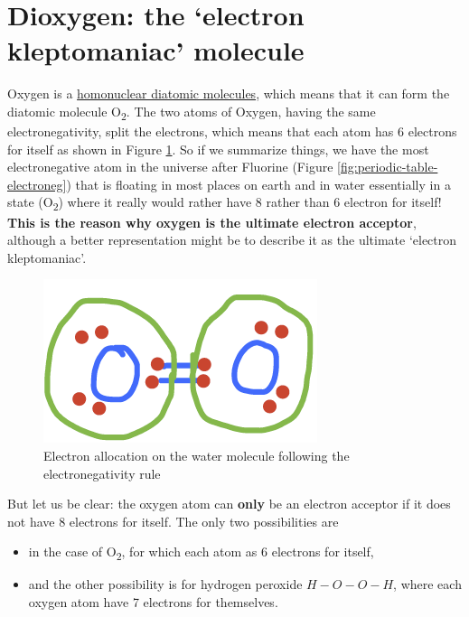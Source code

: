 \documentclass[]{book}
\providecommand{\tightlist}{%
  \setlength{\itemsep}{0pt}\setlength{\parskip}{0pt}}
\theoremstyle{definition}
\theoremstyle{definition}
\theoremstyle{definition}
\theoremstyle{remark}
\begin{document}
\section{\texorpdfstring{Dioxygen: the `electron kleptomaniac'
molecule}{Dioxygen: the electron kleptomaniac molecule}}\label{dioxygen-the-electron-kleptomaniac-molecule}

Oxygen is a
\href{https://en.wikipedia.org/wiki/Diatomic_molecule}{homonuclear
diatomic molecules}, which means that it can form the diatomic molecule
O\textsubscript{2}. The two atoms of Oxygen, having the same
electronegativity, split the electrons, which means that each atom has 6
electrons for itself as shown in Figure \ref{fig:elecalloc-O2}. So if we
summarize things, we have the most electronegative atom in the universe
after Fluorine (Figure \ref{fig:periodic-table-electroneg}) that is
floating in most places on earth and in water essentially in a state
(O\textsubscript{2}) where it really would rather have 8 rather than 6
electron for itself! \textbf{This is the reason why oxygen is the
ultimate electron acceptor}, although a better representation might be
to describe it as the ultimate `electron kleptomaniac'.

\begin{figure}

{\centering \includegraphics[width=0.25\linewidth]{pictures/ElecAlloc_O2} 

}

\caption{Electron allocation on the water molecule following the electronegativity rule}\label{fig:elecalloc-O2}
\end{figure}

But let us be clear: the oxygen atom can \textbf{only} be an electron
acceptor if it does not have 8 electrons for itself. The only two
possibilities are

\begin{itemize}
\tightlist
\item
  in the case of O\textsubscript{2}, for which each atom as 6 electrons
  for itself,
\item
  and the other possibility is for hydrogen peroxide \(H-O-O-H\), where
  each oxygen atom have 7 electrons for themselves.
\end{itemize}
\end{document}
